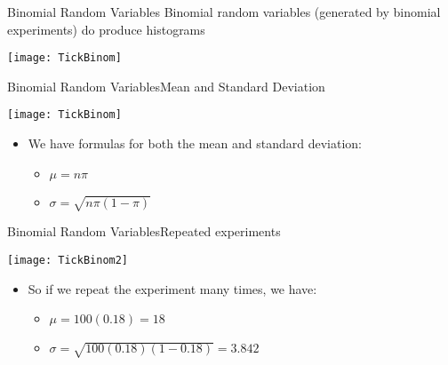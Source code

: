 \documentclass[xcolor=dvipsnames]{beamer}
\begin{document}
\begin{frame}{Binomial Random Variables}
	Binomial random variables (generated by binomial experiments) do produce histograms
	\begin{center}
		\texttt{[image: TickBinom]}
	\end{center}
\end{frame}

\begin{frame}{Binomial Random Variables}{Mean and Standard Deviation}
	\begin{center}
		\texttt{[image: TickBinom]}
	\end{center}
	\begin{itemize}
		\item We have formulas for both the mean and standard deviation:
		\begin{itemize}
			\item $\mu = n \pi$
			\item $\sigma = \sqrt{n \pi (1-\pi)}$
		\end{itemize}
	\end{itemize}
\end{frame}

\begin{frame}{Binomial Random Variables}{Repeated experiments}
	\begin{center}
		\texttt{[image: TickBinom2]}
	\end{center}
	\begin{itemize}
		\item So if we repeat the experiment many times, we have:
		\begin{itemize}
			\item $\mu = 100 (0.18) = 18$
			\item $\sigma = \sqrt{100 (0.18) (1-0.18)} = 3.842$
		\end{itemize}
	\end{itemize}
\end{frame}
\end{document}

